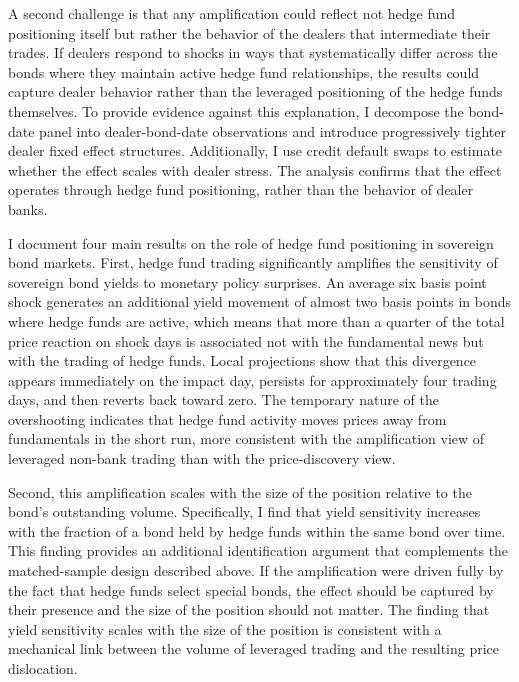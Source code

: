 \documentclass[english, 11pt, oneside]{article}
\begin{document}
A second challenge is that any amplification could reflect not hedge fund positioning itself but rather the behavior of the dealers that intermediate their trades. If dealers respond to shocks in ways that systematically differ across the bonds where they maintain active hedge fund relationships, the results could capture dealer behavior rather than the leveraged positioning of the hedge funds themselves. To provide evidence against this explanation, I decompose the bond-date panel into dealer-bond-date observations and introduce progressively tighter dealer fixed effect structures. Additionally, I use credit default swaps to estimate whether the effect scales with dealer stress. The analysis confirms that the effect operates through hedge fund positioning, rather than the behavior of dealer banks.

I document four main results on the role of hedge fund positioning in sovereign bond markets. First, hedge fund trading significantly amplifies the sensitivity of sovereign bond yields to monetary policy surprises. An average six basis point shock generates an additional yield movement of almost two basis points in bonds where hedge funds are active, which means that more than a quarter of the total price reaction on shock days is associated not with the fundamental news but with the trading of hedge funds. Local projections show that this divergence appears immediately on the impact day, persists for approximately four trading days, and then reverts back toward zero. The temporary nature of the overshooting indicates that hedge fund activity moves prices away from fundamentals in the short run, more consistent with the amplification view of leveraged non-bank trading than with the price-discovery view.

Second, this amplification scales with the size of the position relative to the bond's outstanding volume. Specifically, I find that yield sensitivity increases with the fraction of a bond held by hedge funds within the same bond over time. This finding provides an additional identification argument that complements the matched-sample design described above. If the amplification were driven fully by the fact that hedge funds select special bonds, the effect should be captured by their presence and the size of the position should not matter. The finding that yield sensitivity scales with the size of the position is consistent with a mechanical link between the volume of leveraged trading and the resulting price dislocation.
\end{document}
